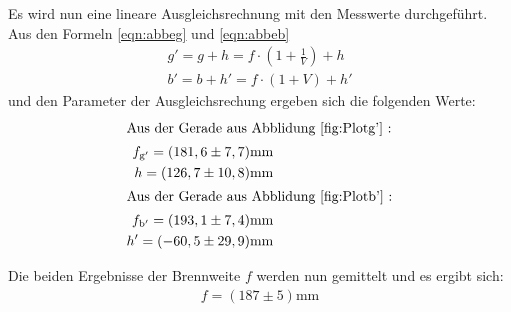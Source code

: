 Es wird nun eine lineare Ausgleichsrechnung mit den Messwerte durchgeführt.
Aus den Formeln  \eqref{eqn:abbeg} und \eqref{eqn:abbeb}
\begin{align}
  g'=g+h=f\cdot \left(1+\frac{1}{V}\right)+h \label{eqn:abbeg}\\
  b'=b+h'=f\cdot \left(1+V\right)+h' \label{eqn:abbeb}
\end{align}
und den Parameter der
Ausgleichsrechung ergeben sich die folgenden Werte:
\begin{align*}
\intertext{Aus der Gerade aus Abblidung \ref{fig:Plotg'} :}
  f_\mathrm{g'}=(181,6\pm7,7)\si{\milli\meter} \\
  h=(126,7\pm10,8)\si{\milli\meter} \\
\intertext{Aus der Gerade aus Abblidung \ref{fig:Plotb'} :}
f_\mathrm{b'}=(193,1\pm7,4)\si{\milli\meter} \\
  h'=(-60,5\pm29,9)\si{\milli\meter} \\
\end{align*}

Die beiden Ergebnisse der Brennweite $f$
werden nun gemittelt und es ergibt sich:
\begin{align*}
  f=(187\pm5)\si{\milli\meter}
\end{align*}
